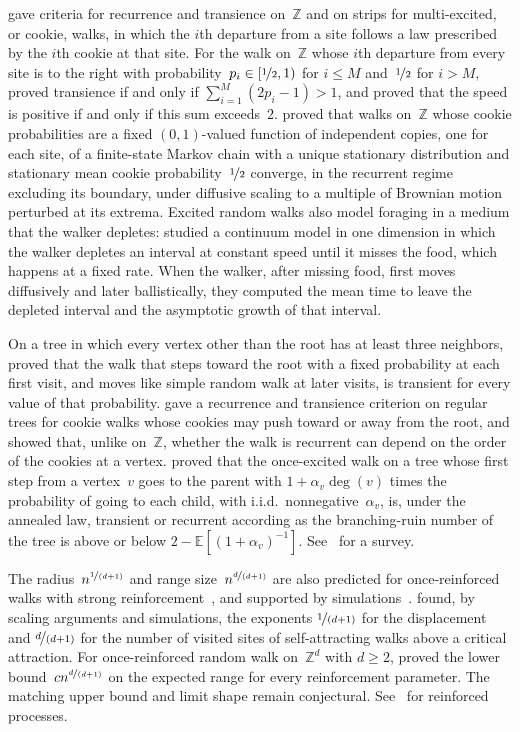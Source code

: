 \documentclass[11pt]{amsart}
\theoremstyle{plain}
\theoremstyle{definition}
\newcommand{\Z}{\mathbb Z}
\newcommand{\E}{\mathbb E}
\newcommand{\nf}{\nicefrac}
\numberwithin{equation}{section}
\begin{document}
\citet{Zerner2005,Zerner2006} gave criteria for recurrence and transience on~$\Z$ and on strips for multi-excited, or cookie, walks, in which the $i$th departure from a site follows a law prescribed by the $i$th cookie at that site. For the walk on~$\Z$ whose $i$th departure from every site is to the right with probability~$p_i\in[\nf12,1)$ for $i\leq M$ and~$\nf12$ for $i>M$, \citet{Zerner2005} proved transience if and only if $\sum_{i=1}^M(2p_i-1)>1$, and \citet*{BasdevantSingh2008} proved that the speed is positive if and only if this sum exceeds~$2$. \citet*{KosyginaMountfordPeterson2022} proved that walks on~$\Z$ whose cookie probabilities are a fixed $(0,1)$-valued function of independent copies, one for each site, of a finite-state Markov chain with a unique stationary distribution and stationary mean cookie probability~$\nf12$ converge, in the recurrent regime excluding its boundary, under diffusive scaling to a multiple of Brownian motion perturbed at its extrema. Excited random walks also model foraging in a medium that the walker depletes: \citet*{CamposCristinMendez2021} studied a continuum model in one dimension in which the walker depletes an interval at constant speed until it misses the food, which happens at a fixed rate. When the walker, after missing food, first moves diffusively and later ballistically, they computed the mean time to leave the depleted interval and the asymptotic growth of that interval.

On a tree in which every vertex other than the root has at least three neighbors, \citet{Volkov2003} proved that the walk that steps toward the root with a fixed probability at each first visit, and moves like simple random walk at later visits, is transient for every value of that probability. \citet*{BasdevantSingh2009} gave a recurrence and transience criterion on regular trees for cookie walks whose cookies may push toward or away from the root, and showed that, unlike on~$\Z$, whether the walk is recurrent can depend on the order of the cookies at a vertex. \citet*{LeNguyen2026} proved that the once-excited walk on a tree whose first step from a vertex~$v$ goes to the parent with $1+\alpha_v\deg(v)$ times the probability of going to each child, with i.i.d.\ nonnegative~$\alpha_v$, is, under the annealed law, transient or recurrent according as the branching-ruin number of the tree is above or below $2-\E[(1+\alpha_v)^{-1}]$. See~\citet{KosyginaZerner2013} for a survey.

The radius~$n^{\nf{1}{(d+1)}}$ and range size~$n^{\nf{d}{(d+1)}}$ are also predicted for once-reinforced walks with strong reinforcement~\citep{Beffara2011,ElboimKozma2026}, and supported by simulations~\citep{FosterGrassbergerPaczuski2009}. \citet*{OrdemannBerkolaikoHavlinBunde2000,OrdemannEtAl2001} found, by scaling arguments and simulations, the exponents $\nf{1}{(d+1)}$ for the displacement and $\nf{d}{(d+1)}$ for the number of visited sites of self-attracting walks above a critical attraction. For once-reinforced random walk on~$\Z^d$ with $d\geq2$, \citet{BouRabeePeres2026ORRW} proved the lower bound~$cn^{\nf{d}{(d+1)}}$ on the expected range for every reinforcement parameter. The matching upper bound and limit shape remain conjectural. See~\citet{Pemantle2007} for reinforced processes.
\end{document}
